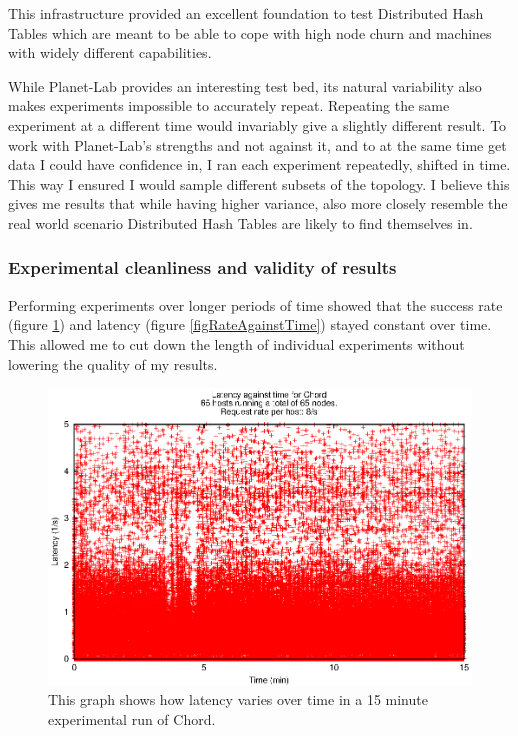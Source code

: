 This infrastructure provided an excellent foundation to test Distributed Hash Tables which are meant to be able to cope with high node churn and machines with widely different capabilities.

While Planet-Lab provides an interesting test bed, its natural variability also makes experiments impossible to accurately repeat. Repeating the same experiment at a different time would invariably give a slightly different result.
To work with Planet-Lab's strengths and not against it, and to at the same time get data I could have confidence in, I ran each experiment repeatedly, shifted in time. This way I ensured I would sample different subsets of the topology. I believe this gives me results that while having higher variance, also more closely resemble the real world scenario Distributed Hash Tables are likely to find themselves in.

\subsubsection{Experimental cleanliness and validity of results}
Performing experiments over longer periods of time showed that the success rate (figure \ref{figLatencyAgainstTime}) and latency (figure \ref{figRateAgainstTime}) stayed constant over time. This allowed me to cut down the length of individual experiments without lowering the quality of my results.

\begin{figure}[!htb]
  \begin{center}
    \includegraphics[]{illustrations/latency_aginst_time_chord.eps}
    \caption{This graph shows how latency varies over time in a 15 minute experimental run of Chord.}
    \label{figLatencyAgainstTime}
  \end{center}
\end{figure}


